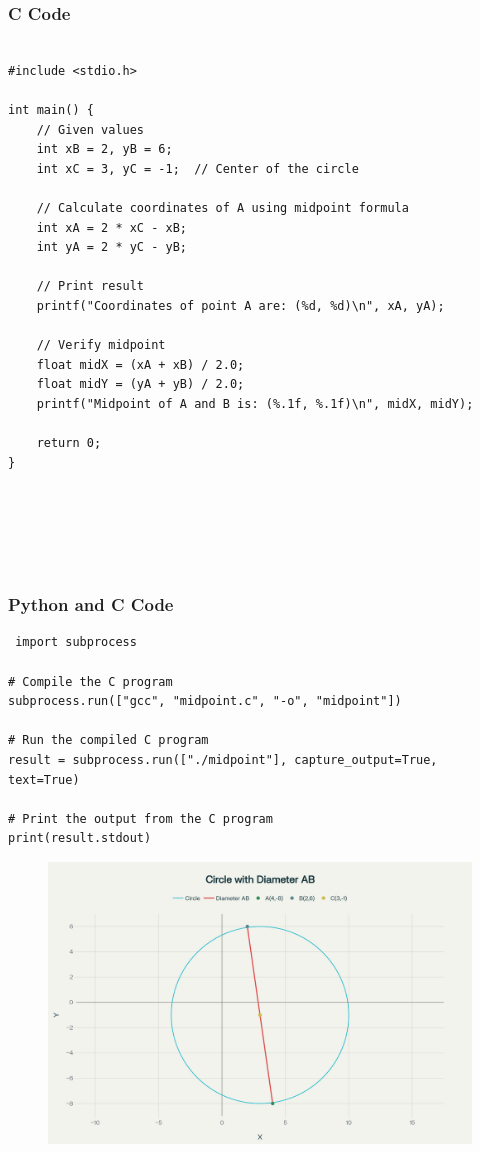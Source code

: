 \documentclass{beamer}
\begin{document}
 




\begin{frame}[fragile]
\frametitle{C Code}
\begin{lstlisting}
  
#include <stdio.h>

int main() {
    // Given values
    int xB = 2, yB = 6;
    int xC = 3, yC = -1;  // Center of the circle

    // Calculate coordinates of A using midpoint formula
    int xA = 2 * xC - xB;
    int yA = 2 * yC - yB;

    // Print result
    printf("Coordinates of point A are: (%d, %d)\n", xA, yA);

    // Verify midpoint
    float midX = (xA + xB) / 2.0;
    float midY = (yA + yB) / 2.0;
    printf("Midpoint of A and B is: (%.1f, %.1f)\n", midX, midY);

    return 0;
}






\end{lstlisting}

\end{frame}


\begin{frame}[fragile]
\frametitle{Python and C Code}

\begin{lstlisting}
 import subprocess

# Compile the C program
subprocess.run(["gcc", "midpoint.c", "-o", "midpoint"])

# Run the compiled C program
result = subprocess.run(["./midpoint"], capture_output=True, text=True)

# Print the output from the C program 
print(result.stdout)
\end{lstlisting}

\end{frame}

\begin{frame}
    
\begin{figure}[H]
    \centering
    \includegraphics[width=0.5\linewidth]{beamer/fig.png}
    \caption{}
    \label{fig:placeholder}
\end{figure} 
\end{frame}
\end{document}
